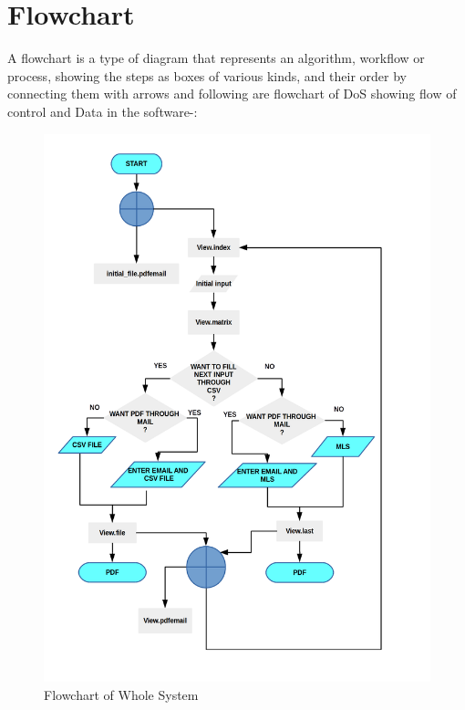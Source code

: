 \section{Flowchart}
A flowchart is a type of diagram that represents an algorithm, workflow or process, showing the steps as boxes of various kinds, and their order by connecting them with arrows
and following are flowchart of DoS showing flow of control and Data in the software-:

\begin{figure}[H]
\centering \includegraphics[scale=0.26]{images/flowchart.png}
\caption{Flowchart of Whole System}
\end{figure}
